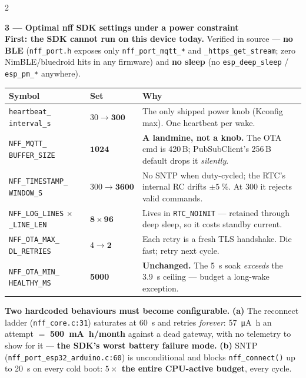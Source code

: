 \documentclass[9pt,a4paper]{extarticle}
\newcommand{\bad}[1]{\textcolor{warn}{\textbf{#1}}}
\begin{document}
\begin{multicols}{2}
{\scriptsize
\textbf{3 --- Optimal nff SDK settings under a power constraint}\\[0.5mm]
\bad{First: the SDK cannot run on this device today.} Verified in source --- \textbf{no BLE}
(\texttt{nff\_port.h} exposes only \texttt{nff\_port\_mqtt\_*} and \texttt{\_https\_get\_stream};
zero NimBLE/bluedroid hits in any firmware) and \textbf{no sleep} (no \texttt{esp\_deep\_sleep} /
\texttt{esp\_pm\_*} anywhere).\\[0.8mm]
\begin{tabular}{@{}p{26mm}p{11mm}p{40mm}@{}}
\toprule
\textbf{Symbol} & \textbf{Set} & \textbf{Why} \\
\midrule
\texttt{heartbeat\_} \texttt{interval\_s} & $30\to\mathbf{300}$ & The only shipped power knob (Kconfig max). One heartbeat per wake. \\
\texttt{NFF\_MQTT\_} \texttt{BUFFER\_SIZE} & $\mathbf{1024}$ & \bad{A landmine, not a knob.} The OTA cmd is 420\,B; PubSubClient's 256\,B default drops it \emph{silently}. \\
\texttt{NFF\_TIMESTAMP\_} \texttt{WINDOW\_S} & $300\to\mathbf{3600}$ & No SNTP when duty-cycled; the RTC's internal RC drifts $\pm\SI{5}{\percent}$. At 300 it rejects valid commands. \\
\texttt{NFF\_LOG\_LINES} $\times$\texttt{\_LINE\_LEN} & $\mathbf{8\times96}$ & Lives in \texttt{RTC\_NOINIT} --- retained through deep sleep, so it costs standby current. \\
\texttt{NFF\_OTA\_MAX\_} \texttt{DL\_RETRIES} & $4\to\mathbf{2}$ & Each retry is a fresh TLS handshake. Die fast; retry next cycle. \\
\texttt{NFF\_OTA\_MIN\_} \texttt{HEALTHY\_MS} & \textbf{5000} & \textbf{Unchanged.} The \SI{5}{\second} soak \emph{exceeds} the \SI{3.9}{\second} ceiling --- budget a long-wake exception. \\
\bottomrule
\end{tabular}

\vspace{0.6mm}
\bad{Two hardcoded behaviours must become configurable.} \textbf{(a)} The reconnect ladder
(\texttt{nff\_core.c:31}) saturates at \SI{60}{\second} and retries \emph{forever}:
\SI{57}{\micro\ampere\hour} an attempt $=$ \bad{\SI{500}{\milli\ampere\hour}/month} against a dead
gateway, with no telemetry to show for it --- \textbf{the SDK's worst battery failure mode.}
\textbf{(b)} SNTP (\texttt{nff\_port\_esp32\_arduino.c:60}) is unconditional and blocks
\texttt{nff\_connect()} up to \SI{20}{\second} on every cold boot: \bad{$5\times$ the entire
CPU-active budget}, every cycle.

}
\end{multicols}
\end{document}
